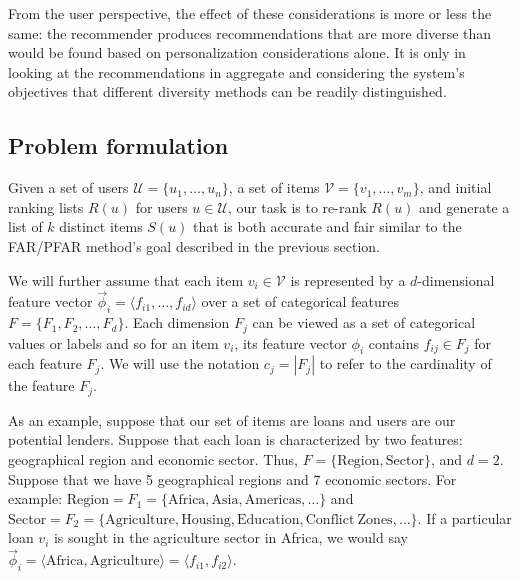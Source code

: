 From the user perspective, the effect of these considerations is more or less the same: the recommender produces recommendations that are more diverse than would be found based on personalization considerations alone. It is only in looking at the recommendations in aggregate and considering the system's objectives that different diversity methods can be readily distinguished.

\subsection{\textbf{Problem formulation}}
\label{subsec:ofair_prob_formu}

Given a set of users $\mathcal U=\{u_1,\ldots,u_n\}$, a set of items $\mathcal V=\{v_1,\ldots,v_m\}$, and initial ranking lists $R(u)$ for users $u\in \mathcal U$, our task is to re-rank $R(u)$ and generate a list of $k$ distinct items $S(u)$ that is both accurate and fair similar to the FAR/PFAR method's goal \cite{liu2019personalized} described in the previous section.

We will further assume that each item $v_i\in\mathcal V$ is represented by a $d$-dimensional feature vector $\vec{\phi}_i = \langle f_{i1},\ldots,f_{id}\rangle$ over a set of categorical features $F = \{F_1, F_2, \ldots, F_d\}$. Each dimension $F_j$ can be viewed as a set of categorical values or labels and so for an item $v_i$, its feature vector $\phi_i$ contains $f_{ij} \in F_j$ for each feature $F_j$. We will use the notation $c_j = |F_j|$ to refer to the cardinality of the feature $F_{j}$.

As an example, suppose that our set of items are loans and users are our potential lenders. Suppose that each loan is characterized by two features: geographical region and economic sector. Thus, $F = \{\mathrm{Region}, \mathrm{Sector} \}$, and $d = 2$. Suppose that we have 5 geographical regions and 7 economic sectors. For example:  $\mathrm{Region} = F_1 = \{\mbox{Africa}, \mbox{Asia}, \mbox{Americas}, \ldots\}$ and $\mathrm{Sector} = F_2 = \{\mathrm{Agriculture}, \mathrm{Housing}, \mathrm{Education}, \mathrm{Conflict~Zones}, \ldots\}$. If a particular loan $v_i$ is sought in the agriculture sector in Africa, we would say $\vec{\phi}_i = \langle \mathrm{Africa}, \mathrm{Agriculture} \rangle = \langle f_{i1}, f_{i2} \rangle$.

